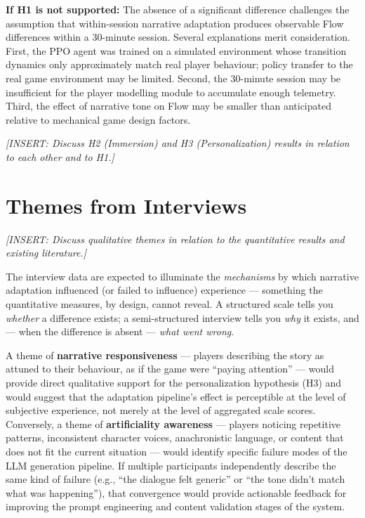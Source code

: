\textbf{If H1 is not supported:} The absence of a significant difference challenges the assumption that within-session narrative adaptation produces observable Flow differences within a 30-minute session. Several explanations merit consideration. First, the PPO agent was trained on a simulated environment whose transition dynamics only approximately match real player behaviour; policy transfer to the real game environment may be limited. Second, the 30-minute session may be insufficient for the player modelling module to accumulate enough telemetry. Third, the effect of narrative tone on Flow may be smaller than anticipated relative to mechanical game design factors.

\textit{[INSERT: Discuss H2 (Immersion) and H3 (Personalization) results in relation to each other and to H1.]}

\section{Themes from Interviews}

\textit{[INSERT: Discuss qualitative themes in relation to the quantitative results and existing literature.]}

The interview data are expected to illuminate the \textit{mechanisms} by which narrative adaptation influenced (or failed to influence) experience --- something the quantitative measures, by design, cannot reveal. A structured scale tells you \textit{whether} a difference exists; a semi-structured interview tells you \textit{why} it exists, and --- when the difference is absent --- \textit{what went wrong}.

A theme of \textbf{narrative responsiveness} --- players describing the story as attuned to their behaviour, as if the game were ``paying attention'' --- would provide direct qualitative support for the personalization hypothesis (H3) and would suggest that the adaptation pipeline's effect is perceptible at the level of subjective experience, not merely at the level of aggregated scale scores. Conversely, a theme of \textbf{artificiality awareness} --- players noticing repetitive patterns, inconsistent character voices, anachronistic language, or content that does not fit the current situation --- would identify specific failure modes of the LLM generation pipeline. If multiple participants independently describe the same kind of failure (e.g., ``the dialogue felt generic'' or ``the tone didn't match what was happening''), that convergence would provide actionable feedback for improving the prompt engineering and content validation stages of the system.

